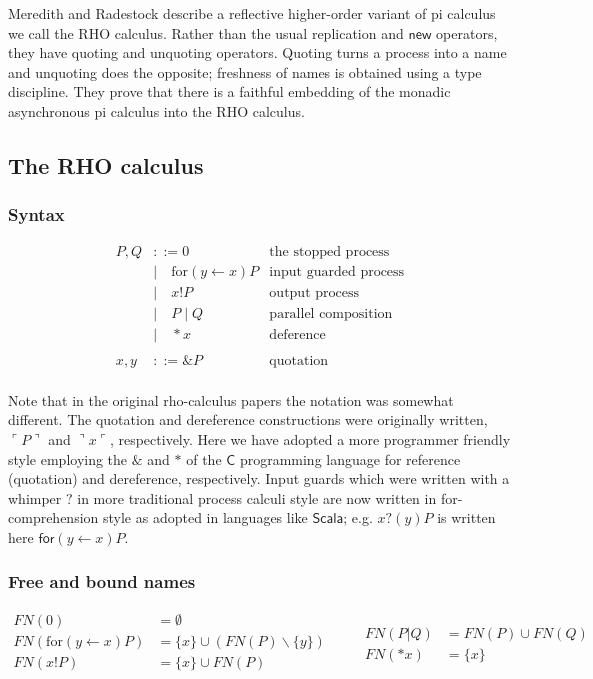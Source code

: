 \documentclass[a4paper,UKenglish]{lipics-v2016}
\newcommand{\new}{\mathsf{new}}
\newcommand{\for}{\mathrm{for }}
\newcommand{\from}{\leftarrow}
\begin{document}
  Meredith and Radestock \cite{DBLP:journals/entcs/MeredithR05} describe a reflective higher-order variant of pi calculus we call the RHO calculus.  Rather than the usual replication and $\new$ operators, they have quoting and unquoting operators.  Quoting turns a process into a name and unquoting does the opposite; freshness of names is obtained using a type discipline.  They prove that there is a faithful embedding of the monadic asynchronous pi calculus into the RHO calculus.

\subsection{The RHO calculus}
\subsubsection{Syntax}
\[\begin{array}{rlr}
  P, Q &::= 0 & \mbox{the stopped process}\\ 
  &| \quad \for(y \from x)P & \mbox{input guarded process} \\ 
  &| \quad x!P & \mbox{output process}\\ 
  &| \quad P \;|\; Q & \mbox{parallel composition}\\
  &| \quad *x & \mbox{deference}\\ 
  &\\
  x, y &::= \&P & \mbox{quotation}\\ 
\end{array}\]

Note that in the original rho-calculus papers the notation was
somewhat different. The quotation and dereference constructions were
originally written, $\ulcorner P \urcorner$ and $\urcorner x \ulcorner$,
respectively. Here we have adopted a more programmer
friendly style employing the $\&$ and $*$ of the $\mathsf{C}$ programming
language for reference (quotation) and dereference, respectively. Input
guards which were written with a whimper $?$ in more traditional process calculi style  are now written in for-comprehension style as adopted
in languages like $\mathsf{Scala}$; e.g. $x?(y)P$ is written
here $\mathsf{for}( y \from x )P$.

\subsubsection{Free and bound names}
\[\begin{array}{rl}
FN(0) &= \emptyset \\
FN(\for(y \from x)P) &= \{x\}\cup (FN(P)\backslash \{y\}) \\
FN(x!P) &= \{x\}\cup FN(P) \\
\end{array}\quad\quad
\begin{array}{rl}
FN(P|Q) &= FN(P)\cup FN(Q) \\
FN(*x) &= \{x\}
\end{array}\]
\end{document}
